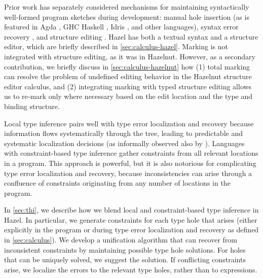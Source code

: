 Prior work has separately considered mechanisms for maintaining syntactically well-formed program sketches during development: manual hole insertion (as is featured in Agda \cite{norell:thesis}, GHC Haskell \cite{haskell-holes}, Idris \cite{DBLP:journals/jfp/Brady13}, and other languages), syntax error recovery \cite{medeiros20,sorkin11}, and structure editing \cite{HazelnutPOPL}. 
Hazel has both a textual syntax and a structure editor, which are briefly described in \cref{sec:calculus-hazel}.
Marking is not integrated with structure editing, as it was in Hazelnut. 
However, as a secondary contribution, 
we briefly discuss in \cref{sec:calculus-hazelnut} how (1)  total marking can resolve the problem of undefined editing behavior in the Hazelnut structure editor calculus, 
and (2) integrating marking with typed structure editing allows us to re-mark only where necessary based on the edit location and the type and binding structure.

Local type inference pairs well with type error localization and recovery because information flows systematically through the tree, leading to predictable and systematic localization decisions (as informally observed also by \cite{LocalInf}). Languages with constraint-based type inference gather constraints from all relevant locations in a program. This approach is powerful, but it is also notorious for complicating type error localization and recovery, because inconsistencies can arise through a confluence of constraints originating from any number of locations in the program. 

In \cref{sec:thi}, we describe how we blend local and constraint-based type inference in Hazel. In particular,  
we generate constraints for each type hole that arises (either explicitly in the program or during type error localization and recovery as defined in \cref{sec:calculus}). 
We develop a unification algorithm that can recover from inconsistent constraints by maintaining possible type hole solutions. For holes that can be uniquely solved, we suggest the solution. 
If conflicting constraints arise, we localize the errors to the relevant type holes, rather 
than to expressions. 


